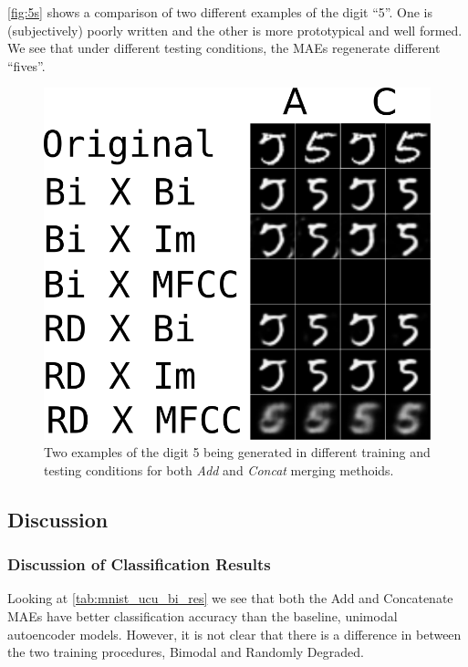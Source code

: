 \autoref{fig:5s} shows a comparison of two different examples of the digit ``5''. One is (subjectively) poorly written and the other is more prototypical and well formed. We see that under different testing conditions, the MAEs regenerate different ``fives''.
\begin{figure}[h]
\begin{center}
	\includegraphics{Figs/mnistSpoken/5s.png}
	\caption{Two examples of the digit 5 being generated in different training and testing conditions for both \textit{Add} and \textit{Concat} merging methoids.}
	\label{fig:5s}
\end{center}
\end{figure}



\subsection{Discussion}

\subsubsection{Discussion of Classification Results}
Looking at \autoref{tab:mnist_ucu_bi_res} we see that both the Add and Concatenate MAEs have better classification accuracy than the baseline, unimodal autoencoder models. However, it is not clear that there is a difference in between the two training procedures, Bimodal and Randomly Degraded.

